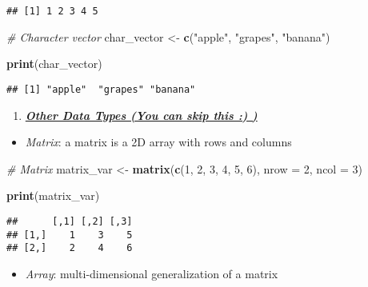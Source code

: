 \documentclass[
]{article}
\newenvironment{Shaded}{\begin{snugshade}}{\end{snugshade}}
\newcommand{\AttributeTok}[1]{\textcolor[rgb]{0.13,0.29,0.53}{#1}}
\newcommand{\CommentTok}[1]{\textcolor[rgb]{0.56,0.35,0.01}{\textit{#1}}}
\newcommand{\DecValTok}[1]{\textcolor[rgb]{0.00,0.00,0.81}{#1}}
\newcommand{\FunctionTok}[1]{\textcolor[rgb]{0.13,0.29,0.53}{\textbf{#1}}}
\newcommand{\NormalTok}[1]{#1}
\newcommand{\OtherTok}[1]{\textcolor[rgb]{0.56,0.35,0.01}{#1}}
\newcommand{\StringTok}[1]{\textcolor[rgb]{0.31,0.60,0.02}{#1}}
\providecommand{\tightlist}{%
  \setlength{\itemsep}{0pt}\setlength{\parskip}{0pt}}
\begin{document}
\begin{enumerate}
\begin{verbatim}
## [1] 1 2 3 4 5
\end{verbatim}

\begin{Shaded}
\begin{Highlighting}[]
  \CommentTok{\# Character vector}
\NormalTok{  char\_vector }\OtherTok{\textless{}{-}} \FunctionTok{c}\NormalTok{(}\StringTok{"apple"}\NormalTok{, }\StringTok{"grapes"}\NormalTok{, }\StringTok{"banana"}\NormalTok{)}

  \FunctionTok{print}\NormalTok{(char\_vector)}
\end{Highlighting}
\end{Shaded}

\begin{verbatim}
## [1] "apple"  "grapes" "banana"
\end{verbatim}

  \begin{enumerate}
  \def\labelenumii{\arabic{enumii}.}
  \setcounter{enumii}{4}
  \tightlist
  \item
    \ul{\textbf{\emph{Other Data Types (You can skip this :) )}}}
  \end{enumerate}

  \begin{itemize}
  \tightlist
  \item
    \emph{Matrix}: a matrix is a 2D array with rows and columns
  \end{itemize}

\begin{Shaded}
\begin{Highlighting}[]
\CommentTok{\# Matrix}
\NormalTok{matrix\_var }\OtherTok{\textless{}{-}} \FunctionTok{matrix}\NormalTok{(}\FunctionTok{c}\NormalTok{(}\DecValTok{1}\NormalTok{, }\DecValTok{2}\NormalTok{, }\DecValTok{3}\NormalTok{, }\DecValTok{4}\NormalTok{, }\DecValTok{5}\NormalTok{, }\DecValTok{6}\NormalTok{), }\AttributeTok{nrow =} \DecValTok{2}\NormalTok{, }\AttributeTok{ncol =} \DecValTok{3}\NormalTok{)}

\FunctionTok{print}\NormalTok{(matrix\_var)}
\end{Highlighting}
\end{Shaded}

\begin{verbatim}
##      [,1] [,2] [,3]
## [1,]    1    3    5
## [2,]    2    4    6
\end{verbatim}

  \begin{itemize}
  \tightlist
  \item
    \emph{Array}: multi-dimensional generalization of a matrix
  \end{itemize}


\end{enumerate}
\end{document}
